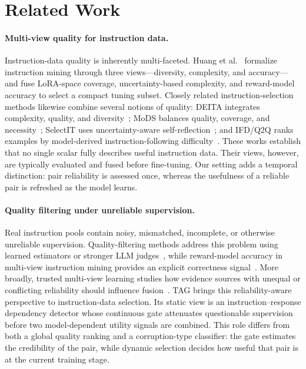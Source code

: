 \section{Related Work}
\label{sec:related}

\paragraph{Multi-view quality for instruction data.}
Instruction-data quality is inherently multi-faceted. Huang
et al.~\cite{huang2024ivm} formalize instruction mining through three
views---diversity, complexity, and accuracy---and fuse LoRA-space
coverage, uncertainty-based complexity, and reward-model accuracy to
select a compact tuning subset. Closely related instruction-selection
methods likewise combine several notions of quality: DEITA
integrates complexity, quality, and diversity~\cite{deita}; MoDS
balances quality, coverage, and necessity~\cite{mods}; SelectIT uses
uncertainty-aware self-reflection~\cite{selectit}; and IFD/Q2Q ranks
examples by model-derived instruction-following
difficulty~\cite{q2q}. These works establish that no single scalar
fully describes useful instruction data. Their views, however, are
typically evaluated and fused before fine-tuning. Our setting adds a
temporal distinction: pair reliability is assessed once, whereas the
usefulness of a reliable pair is refreshed as the model learns.

\paragraph{Quality filtering under unreliable supervision.}
Real instruction pools contain noisy, mismatched, incomplete, or
otherwise unreliable supervision. Quality-filtering methods address
this problem using learned estimators or stronger LLM
judges~\cite{alpagasus,cpqs2026}, while reward-model accuracy in
multi-view instruction mining provides an explicit correctness
signal~\cite{huang2024ivm}. More broadly, trusted multi-view learning
studies how evidence sources with unequal or conflicting reliability
should influence fusion~\cite{tmc2021,rcml2024}. TAG brings this
reliability-aware perspective to instruction-data selection. Its
static view is an instruction--response dependency detector whose
continuous gate attenuates questionable supervision before two
model-dependent utility signals are combined. This role differs from
both a global quality ranking and a corruption-type classifier: the
gate estimates the credibility of the pair, while dynamic selection
decides how useful that pair is at the current training stage.

